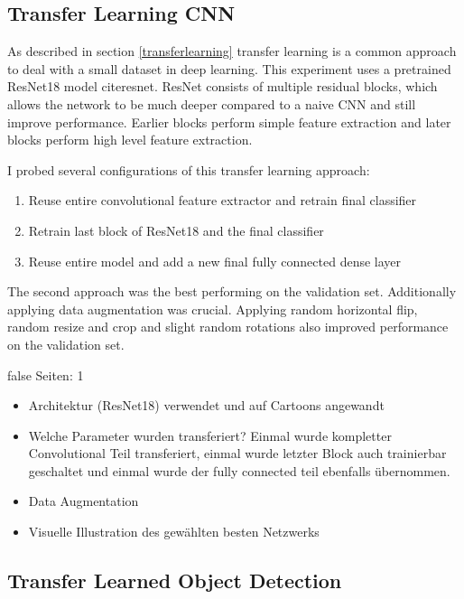 \documentclass[draft,final,oneside]{vutinfth} %
\begin{document}
\fi

\subsection{Transfer Learning CNN}

As described in section \ref{transferlearning} transfer learning is a common approach to deal with a small dataset in deep learning. This experiment uses a pretrained ResNet18 model cite{resnet}. ResNet consists of multiple residual blocks, which allows the network to be much deeper compared to a naive CNN and still improve performance. Earlier blocks perform simple feature extraction and later blocks perform high level feature extraction. 

I probed several configurations of this transfer learning approach:

\begin{enumerate}
\item Reuse entire convolutional feature extractor and retrain final classifier
\item Retrain last block of ResNet18 and the final classifier
\item Reuse entire model and add a new final fully connected dense layer
\end{enumerate}

The second approach was the best performing on the validation set. Additionally applying data augmentation was crucial. Applying random horizontal flip, random resize and crop and slight random rotations also improved performance on the validation set.

\if false
Seiten: 1

\begin{itemize}
\item Architektur (ResNet18) verwendet und auf Cartoons angewandt
\item Welche Parameter wurden transferiert? Einmal wurde kompletter Convolutional Teil transferiert, einmal wurde letzter Block auch trainierbar geschaltet und einmal wurde der fully connected teil ebenfalls übernommen.
\item Data Augmentation
\item Visuelle Illustration des gewählten besten Netzwerks

\end{itemize}
\fi


\subsection{Transfer Learned Object Detection}
\end{document}
